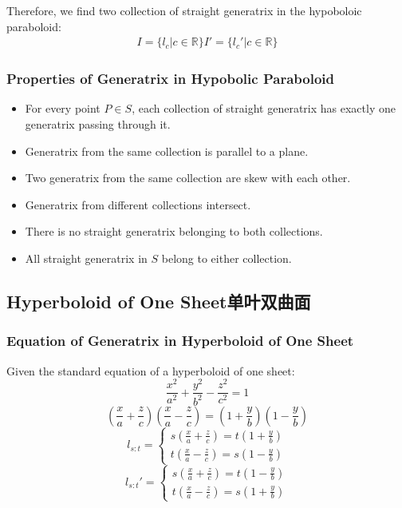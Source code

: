 \documentclass[onecolumn]{ctexart}
\begin{document}
Therefore, we find two collection of straight generatrix in the hypoboloic 
paraboloid:
\begin{equation}
  \begin{split}
    I = \lbrace l_c | c \in \mathbb{R} \rbrace
    I' = \lbrace l_c' | c \in \mathbb{R} \rbrace
  \end{split}
\end{equation}

\subsubsection{Properties of Generatrix in Hypobolic Paraboloid}
\begin{itemize}
  \item For every point $P \in S$, each collection of straight generatrix has 
  exactly one generatrix passing through it.
  \item Generatrix from the same collection is parallel to a plane.
  \item Two generatrix from the same collection are skew with each other.
  \item Generatrix from different collections intersect.
  \item There is no straight generatrix belonging to both collections.
  \item All straight generatrix in $S$ belong to either collection.
\end{itemize}

\subsection{Hyperboloid of One Sheet单叶双曲面}

\subsubsection{Equation of Generatrix in Hyperboloid of One Sheet}

Given the standard equation of a hyperboloid of one sheet:
\begin{equation}
  \frac{x^2}{a^2} + \frac{y^2}{b^2} - \frac{z^2}{c^2} = 1
\end{equation}
\[
  (\frac{x}{a} + \frac{z}{c})(\frac{x}{a} - \frac{z}{c}) = (1 + \frac{y}{b})(1 - \frac{y}{b})
\]
\begin{equation}
  l_{s:t} =
  \begin{cases}
    s(\frac{x}{a} + \frac{z}{c}) = t(1 + \frac{y}{b}) \\
    t(\frac{x}{a} - \frac{z}{c}) = s(1 - \frac{y}{b})
  \end{cases}
\end{equation}
\begin{equation}
  l_{s:t}' =
  \begin{cases}
    s(\frac{x}{a} + \frac{z}{c}) = t(1 - \frac{y}{b}) \\
    t(\frac{x}{a} - \frac{z}{c}) = s(1 + \frac{y}{b})
  \end{cases}
\end{equation}
\end{document}
